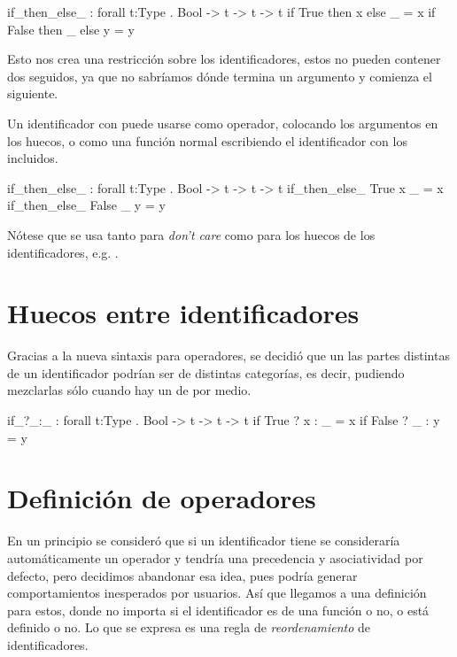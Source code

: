 {\begin{designfr}
\begin{anglercode}
if_then_else_ : forall t:Type . Bool -> t -> t -> t
if True  then x else _ = x
if False then _ else y = y
\end{anglercode}

Esto nos crea una restricción sobre los identificadores, estos no pueden contener dos \inlinecode{\_} seguidos, ya que no sabríamos dónde termina un argumento y comienza el siguiente.

Un identificador con \inlinecode{\_} puede usarse como operador, colocando los argumentos en los huecos, o como una función normal escribiendo el identificador con los \inlinecode{\_} incluidos.

\begin{anglercode}
if_then_else_ : forall t:Type . Bool -> t -> t -> t
if_then_else_ True  x _ = x
if_then_else_ False _ y = y
\end{anglercode}

Nótese que se usa \inlinecode{\_} tanto para \emph{don't care} como para los huecos de los identificadores, e.g. .
\end{designfr}

\section{Huecos entre identificadores}

\begin{designfr}
Gracias a la nueva sintaxis para operadores, se decidió que un las partes distintas de un identificador podrían ser de distintas categorías, es decir, pudiendo mezclarlas sólo cuando hay un \inlinecode{\_} de por medio.

\begin{anglercode}
if_?_:_ : forall t:Type . Bool -> t -> t -> t
if True  ? x : _ = x
if False ? _ : y = y
\end{anglercode}
\end{designfr}

\section{Definición de operadores}

\begin{designfr}
En un principio se consideró que si un identificador tiene \inlinecode{\_} se consideraría automáticamente un operador y tendría una precedencia y asociatividad por defecto, pero decidimos abandonar esa idea, pues podría generar comportamientos inesperados por usuarios. Así que llegamos a una definición para estos, donde no importa si el identificador es de una función o no, o está definido o no. Lo que se expresa es una regla de \emph{reordenamiento} de identificadores.


\end{designfr}}

